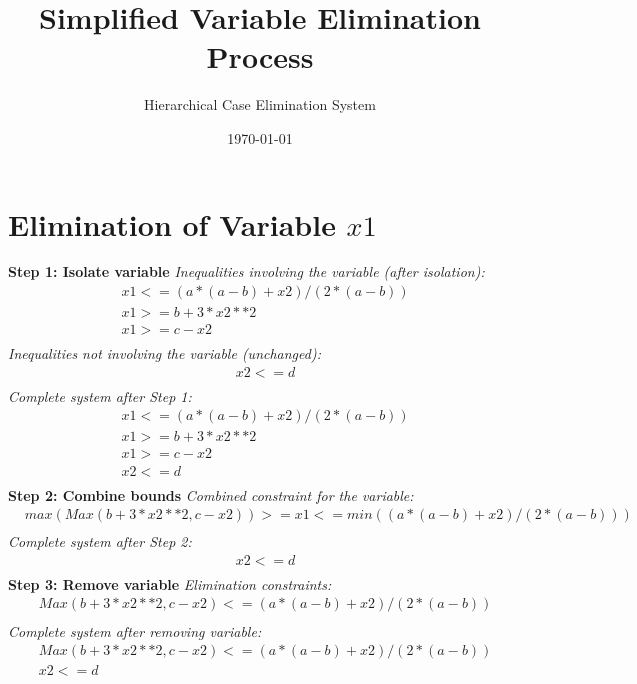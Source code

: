 \documentclass{article}
\begin{document}
\title{Simplified Variable Elimination Process}
\author{Hierarchical Case Elimination System}
\date{\today}
\maketitle

\section{Elimination of Variable $x1$}

\textbf{Step 1: Isolate variable}
\textit{Inequalities involving the variable (after isolation):}
\begin{align}
& x1 <= (a*(a - b) + x2)/(2*(a - b)) \\
& x1 >= b + 3*x2**2 \\
& x1 >= c - x2 \\
\end{align}
\textit{Inequalities not involving the variable (unchanged):}
\begin{align}
& x2 <= d \\
\end{align}
\textit{Complete system after Step 1:}
\begin{align}
& x1 <= (a*(a - b) + x2)/(2*(a - b)) \\
& x1 >= b + 3*x2**2 \\
& x1 >= c - x2 \\
& x2 <= d \\
\end{align}
\textbf{Step 2: Combine bounds}
\textit{Combined constraint for the variable:}
\begin{align}
& max(Max(b + 3*x2**2, c - x2)) >= x1 <= min((a*(a - b) + x2)/(2*(a - b))) \\
\end{align}
\textit{Complete system after Step 2:}
\begin{align}
& x2 <= d \\
\end{align}
\textbf{Step 3: Remove variable}
\textit{Elimination constraints:}
\begin{align}
& Max(b + 3*x2**2, c - x2) <= (a*(a - b) + x2)/(2*(a - b)) \\
\end{align}
\textit{Complete system after removing variable:}
\begin{align}
& Max(b + 3*x2**2, c - x2) <= (a*(a - b) + x2)/(2*(a - b)) \\
& x2 <= d \\
\end{align}
\end{document}
